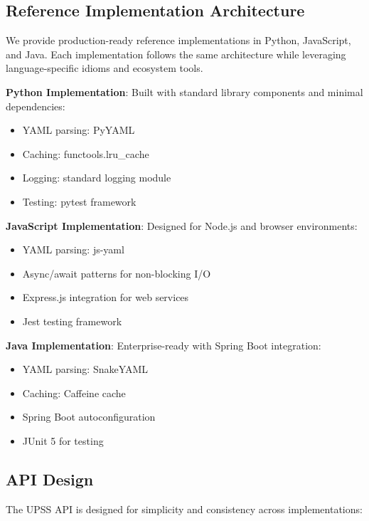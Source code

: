 \subsection{Reference Implementation Architecture}

We provide production-ready reference implementations in Python, JavaScript, and Java. Each implementation follows the same architecture while leveraging language-specific idioms and ecosystem tools.

\textbf{Python Implementation}: Built with standard library components and minimal dependencies:
\begin{itemize}
    \item YAML parsing: PyYAML
    \item Caching: functools.lru\_cache
    \item Logging: standard logging module
    \item Testing: pytest framework
\end{itemize}

\textbf{JavaScript Implementation}: Designed for Node.js and browser environments:
\begin{itemize}
    \item YAML parsing: js-yaml
    \item Async/await patterns for non-blocking I/O
    \item Express.js integration for web services
    \item Jest testing framework
\end{itemize}

\textbf{Java Implementation}: Enterprise-ready with Spring Boot integration:
\begin{itemize}
    \item YAML parsing: SnakeYAML
    \item Caching: Caffeine cache
    \item Spring Boot autoconfiguration
    \item JUnit 5 for testing
\end{itemize}

\subsection{API Design}

The UPSS API is designed for simplicity and consistency across implementations:

